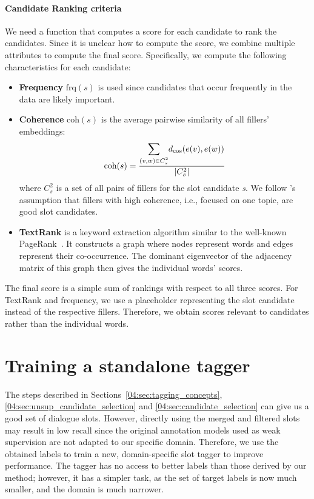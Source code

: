 \paragraph{Candidate Ranking criteria}
We need a function that computes a score for each candidate to rank the candidates.
Since it is unclear how to compute the score, we combine multiple attributes to compute the final score.
Specifically, we compute the following characteristics for each candidate:
\begin{itemize}
    \item \textbf{Frequency} $\text{frq}(s)$ is used since candidates that occur frequently in the data are likely important.
    
    \item \textbf{Coherence} $\text{coh}(s)$ is the average pairwise similarity of all fillers' embeddings:
    \begin{equation}
        \text{coh}(s) = \frac{\mathlarger{\sum}_{(v,w) \in C^2_s}{d_{\cos}(e(v), e(w))}}{|C^2_s|}
    \end{equation}
    where $C^2_s$ is a set of all pairs of fillers for the slot candidate \emph{s}.
    We follow \citet{chen2014leveraging}'s assumption that fillers with high coherence, i.e., focused on one topic, are good slot candidates.
    
    \item \textbf{TextRank} \cite{mihalcea2004textrank} is a keyword extraction algorithm similar to the well-known PageRank~\citep{page1999pagerank}.
    It constructs a graph where nodes represent words and edges represent their co-occurrence.
    The dominant eigenvector of the adjacency matrix of this graph then gives the individual words' scores.
\end{itemize}
The final score is a simple sum of rankings with respect to all three scores.
For TextRank and frequency, we use a placeholder representing the slot candidate instead of the respective fillers.
Therefore, we obtain scores relevant to candidates rather than the individual words.

\section{Training a standalone tagger}
\label{04:sec:training_tagger}

The steps described in Sections~\ref{04:sec:tagging_concepts}, \ref{04:sec:unsup_candidate_selection} and \ref{04:sec:candidate_selection} can give us a good set of dialogue slots. %
However, directly using the merged and filtered slots may result in low recall since the original annotation models used as weak supervision are not adapted to our specific domain.
Therefore, we use the obtained labels to train a new, domain-specific slot tagger to improve performance.
The tagger has no access to better labels than those derived by our method; however, it has a simpler task, as the set of target labels is now much smaller, and the domain is much narrower.

